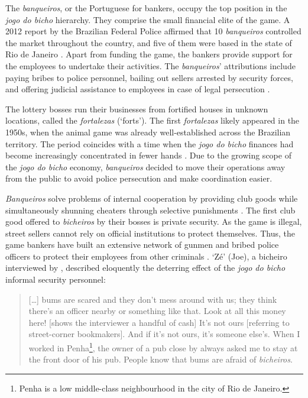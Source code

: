 \documentclass[a4paper,12pt]{article}
\begin{document}
The \textit{banqueiros}, or the Portuguese for bankers, occupy the top position in the \textit{jogo do bicho} hierarchy. They comprise the small financial elite of the game. A 2012 report by the Brazilian Federal Police affirmed that 10 \textit{banqueiros} controlled the market throughout the country, and five of them were based in the state of Rio de Janeiro \citep{globo2012contraventores}. Apart from funding the game, the bankers provide support for the employees to undertake their activities. The \textit{banqueiros}' attributions include paying bribes to police personnel, bailing out sellers arrested by security forces, and offering judicial assistance to employees in case of legal persecution \citep[75]{labronici2012paratodos}.

The lottery bosses run their businesses from fortified houses in unknown locations, called the \textit{fortalezas} (`forts'). The first \textit{fortalezas} likely appeared in the 1950s, when the animal game was already well-established across the Brazilian territory. The period coincides with a time when the \textit{jogo do bicho} finances had become increasingly concentrated in fewer hands \citep[259]{chazkel2011laws}. Due to the growing scope of the \textit{jogo do bicho} economy, \textit{banqueiros} decided to move their operations away from the public to avoid police persecution and make coordination easier. 

\textit{Banqueiros} solve problems of internal cooperation by providing club goods \citep{buchanan1965economic} while simultaneously shunning cheaters through selective punishments \citep{bo2005cooperation, roth1978equilibrium}. The first club good offered to \textit{bicheiros} by their bosses is private security. As the game is illegal, street sellers cannot rely on official institutions to protect themselves. Thus, the game bankers have built an extensive network of gunmen and bribed police officers to protect their employees from other criminals \citetext{\citealp[48]{chinelli1993vazio}; \citealp[51]{labronici2012paratodos}}. `Zé' (Joe), a bicheiro interviewed by \citet[52]{labronici2012paratodos}, described eloquently the deterring effect of the \textit{jogo do bicho} informal security personnel:

\begin{quote}
 [\dots] bums are scared and they don't mess around with us; they think there's an officer nearby or something like that. Look at all this money here! [shows the interviewer a handful of cash] It's not ours [referring to street-corner bookmakers]. And if it's not ours, it's someone else's. When I worked in Penha\footnote{Penha is a low middle-class neighbourhood in the city of Rio de Janeiro.}, the owner of a pub close by always asked me to stay at the front door of his pub. People know that bums are afraid of \textit{bicheiros}.
\end{quote}
\end{document}
